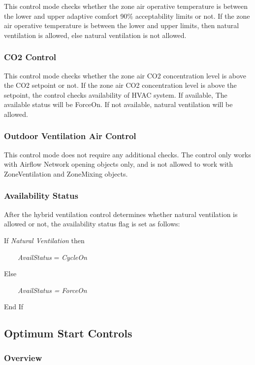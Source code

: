  This control mode checks whether the zone air operative temperature is between the lower and upper adaptive comfort 90\% acceptability limits or not. If the zone air operative temperature is between the lower and upper limits, then natural ventilation is allowed, else natural ventilation is not allowed. 

\subsubsection{CO2 Control}\label{co2-control} 

 This control mode checks whether the zone air CO2 concentration level is above the CO2 setpoint or not. If the zone air CO2 concentration level is above the setpoint, the control checks availability of HVAC system. If available, The available status will be ForceOn. If not available, natural ventilation will be allowed. 

\subsubsection{Outdoor Ventilation Air Control}\label{outdoor-ventilation-air-control}

This control mode does not require any additional checks. The control only works with Airflow Network opening objects only, and is not allowed to work with ZoneVentilation and ZoneMixing objects.

\subsubsection{Availability Status}\label{availability-status}

After the hybrid ventilation control determines whether natural ventilation is allowed or not, the availability status flag is set as follows:

If \emph{Natural Ventilation} then

~~~~\emph{AvailStatus} = \emph{CycleOn}

Else

~~~~\emph{AvailStatus = ForceOn}

End If

\subsection{Optimum Start Controls}\label{optimum-start-controls}

\subsubsection{Overview}\label{overview-1-008}

